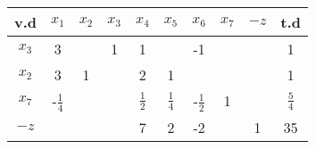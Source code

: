 \begin{center}
	\renewcommand{\arraystretch}{1.5}
	\begin{tabular}{|c|cccccccc|c|}
		\hline
		 v.d  &     $x_1$      & $x_2$ & $x_3$ &     $x_4$     &     $x_5$     &     $x_6$      & $x_7$ & $-z$ &      t.d      \\ \hline
		$x_3$ &       3        &       &   1   &       1       &               &       -1       &       &      &       1       \\
		$x_2$ &       3        &   1   &       &       2       &       1       &                &       &      &       1       \\
		$x_7$ & -$\frac{1}{4}$ &       &       & $\frac{1}{2}$ & $\frac{1}{4}$ & -$\frac{1}{2}$ &   1   &      & $\frac{5}{4}$ \\ \hline
		$-z$  &                &       &       &       7       &       2       &       -2       &       &  1   &      35       \\ \hline
	\end{tabular}
\end{center}
